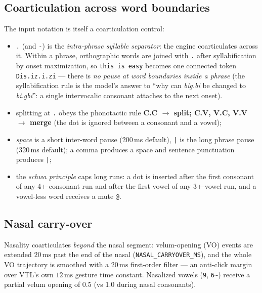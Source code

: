 \documentclass[11pt,a4paper]{article}
\begin{document}
\subsection{Coarticulation across word boundaries}\label{subsec:notation-coart}

The input notation is itself a coarticulation control:

\begin{itemize}[leftmargin=1.5em]
\item \texttt{.} (and \texttt{-}) is the \emph{intra-phrase syllable
      separator}: the engine coarticulates across it. Within a phrase,
      orthographic words are joined with \texttt{.} after syllabification
      by onset maximization, so \texttt{this is easy} becomes one
      connected token \texttt{Dis.iz.i.zi} --- there is \emph{no pause at
      word boundaries inside a phrase} (the syllabification rule is the
      model's answer to ``why can \emph{big.bi} be changed to
      \emph{bi.gbi}'': a single intervocalic consonant attaches to the
      next onset).
\item splitting at \texttt{.} obeys the phonotactic rule
      \textbf{C.C \(\to\) split; C.V, V.C, V.V \(\to\) merge} (the dot is
      ignored between a consonant and a vowel);
\item \emph{space} is a short inter-word pause (200\,ms default),
      \texttt{|} is the long phrase pause (320\,ms default); a comma
      produces a space and sentence punctuation produces \texttt{|};
\item the \emph{schwa principle} caps long runs: a dot is inserted after
      the first consonant of any 4+-consonant run and after the first
      vowel of any 3+-vowel run, and a vowel-less word receives a mute
      \texttt{@}.
\end{itemize}

\subsection{Nasal carry-over}\label{subsec:nasal}

Nasality coarticulates \emph{beyond} the nasal segment: velum-opening
(VO) events are extended \(20\,\mathrm{ms}\) past the end of the nasal
(\texttt{NASAL\_CARRYOVER\_MS}), and the whole VO trajectory is smoothed
with a \(20\,\mathrm{ms}\) first-order filter --- an anti-click margin
over VTL's own \(12\,\mathrm{ms}\) gesture time constant. Nasalized
vowels (\texttt{9}, \texttt{6\~{}}) receive a partial velum opening of
0.5 (vs 1.0 during nasal consonants).
\end{document}
